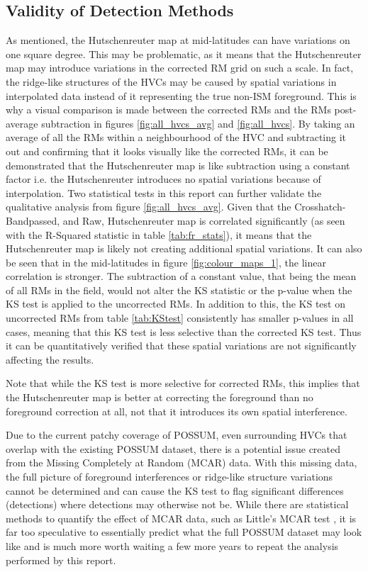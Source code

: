 \subsection{Validity of Detection Methods}
\label{ssec:B5}

As mentioned, the Hutschenreuter map at mid-latitudes can have variations on one square degree. This may be problematic, as it means that the Hutschenreuter map may introduce variations in the corrected RM grid on such a scale. In fact, the ridge-like structures of the HVCs may be caused by spatial variations in interpolated data instead of it representing the true non-ISM foreground. This is why a visual comparison is made between the corrected RMs and the RMs post-average subtraction in figures \ref{fig:all_hvcs_avg} and \ref{fig:all_hvcs}. By taking an average of all the RMs within a neighbourhood of the HVC and subtracting it out and confirming that it looks visually like the corrected RMs, it can be demonstrated that the Hutschenreuter map is like subtraction using a constant factor i.e. the Hutschenreuter introduces no spatial variations because of interpolation. Two statistical tests in this report can further validate the qualitative analysis from figure \ref{fig:all_hvcs_avg}. Given that the Crosshatch-Bandpassed, and Raw, Hutschenreuter map is correlated significantly (as seen with the R-Squared statistic in table \ref{tab:fr_stats}), it means that the Hutschenreuter map is likely not creating additional spatial variations. It can also be seen that in the mid-latitudes in figure \ref{fig:colour_maps_1}, the linear correlation is stronger. The subtraction of a constant value, that being the mean of all RMs in the field, would not alter the KS statistic or the p-value when the KS test is applied to the uncorrected RMs. In addition to this, the KS test on uncorrected RMs from table \ref{tab:KStest} consistently has smaller p-values in all cases, meaning that this KS test is less selective than the corrected KS test. Thus it can be quantitatively verified that these spatial variations are not significantly affecting the results.


Note that while the KS test is more selective for corrected RMs, this implies that the Hutschenreuter map is better at correcting the foreground than no foreground correction at all, not that it introduces its own spatial interference.


Due to the current patchy coverage of POSSUM, even surrounding HVCs that overlap with the existing POSSUM dataset, there is a potential issue created from the Missing Completely at Random (MCAR) data. With this missing data, the full picture of foreground interferences or ridge-like structure variations cannot be determined and can cause the KS test to flag significant differences (detections) where detections may otherwise not be. While there are statistical methods to quantify the effect of MCAR data, such as Little's MCAR test \citep{ID72}, it is far too speculative to essentially predict what the full POSSUM dataset may look like and is much more worth waiting a few more years to repeat the analysis performed by this report.



